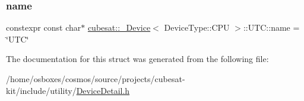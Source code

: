 \subsubsection{\texorpdfstring{name}{name}}
{\footnotesize\ttfamily constexpr const char$\ast$ \hyperlink{structcubesat_1_1__Device}{cubesat\+::\+\_\+\+Device}$<$ Device\+Type\+::\+C\+PU $>$\+::U\+T\+C\+::name = \char`\"{}U\+TC\char`\"{}\hspace{0.3cm}{\ttfamily [static]}}



The documentation for this struct was generated from the following file\+:\begin{DoxyCompactItemize}
\item 
/home/osboxes/cosmos/source/projects/cubesat-\/kit/include/utility/\hyperlink{DeviceDetail_8h}{Device\+Detail.\+h}\end{DoxyCompactItemize}
